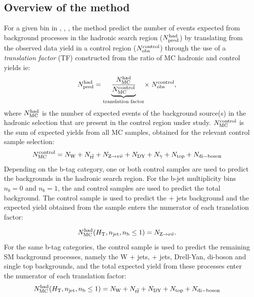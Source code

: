 \subsection{Overview of the method\label{sec:background-method}}

For a given bin in \scalht, \njet, \nb, the method predict the number 
of events expected from background processes in the hadronic search region ($N_{\textrm{pred}}^{\rm  had}$) 
by translating from the observed data yield in a control region 
($N_{\textrm{obs}}^{\rm  control}$) through the use of a {\it translation factor} 
(TF) constructed from the ratio of MC hadronic and control yields ie:
\begin{equation}
  \label{equ:pred-method}
  N_{\textrm{pred}}^{\rm had} = \underbrace{\frac{N_{\rm MC}^{\rm
      had}}{N_{\rm MC}^{\rm
      control}}}_\text{translation factor}\! \times \; N_{\textrm{obs}}^{\rm    control},   
\end{equation}
where $N_{\rm MC}^{\rm had}$ is the number of expected events of the background
source(s) in the hadronic selection that are present in the control region under study.
$N_{\rm MC}^{\rm control}$ is the sum of expected yields from all MC samples, 
obtained for the relevant control sample selection:
\begin{equation}
  \label{equ:ratio-denom}
  N_{\rm MC}^{\rm control} = N_{\rm W} + N_{\relax{t}\overline{\relax{t}}} + N_{{\text Z} \rightarrow \nu\bar{\nu}} +
N_{\rm DY} + N_{\gamma} + N_{\rm top} + N_{\rm di-boson}
\end{equation}
Depending on the b-tag category, one or both control samples are used 
to predict the backgrounds in the hadronic search region. For the b-jet 
multiplicity bins $n_b = 0$ and $n_b = 1$, the \mj and \gj control samples 
are used to predict the total background. The \gj control
sample is used to predict the \znunu + jets background and the expected yield
obtained from the \znunu sample enters the numerator of each translation
factor:

\begin{equation}
  \label{equ:ratio-numer-gj}
  N_{\rm MC}^{\rm had}(\mbox{$H_\text{T}$},n_{\text{jet}},n_{\text{b}} \leq 1) = N_{{\text Z} \rightarrow \nu\bar{\nu}}.
\end{equation}
%
For the same b-tag categories, the \mj control sample is used to predict 
the remaining SM background processes, namely the W + jets, \ttbar + jets,
Drell-Yan, di-boson and single top backgrounds, and the total expected yield
from these processes enter the numerator of each translation factor:
%
\begin{equation}
  \label{equ:ratio-numer-mj}
  N_{\rm MC}^{\rm had}(\mbox{$H_\text{T}$},n_{\text{jet}},n_{\text{b}} \leq 1) = N_{\rm W} +
  N_{\relax{t}\overline{\relax{t}}} + N_{\rm DY} + N_{\rm top} + N_{\rm di-boson}
\end{equation}

